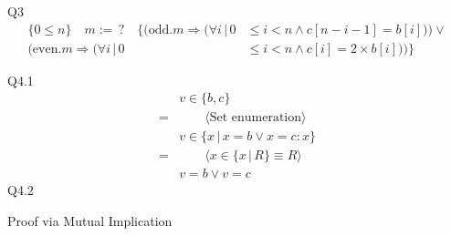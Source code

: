 \documentclass{article}
\begin{document}
    \vspace{10mm}
    Q3 
    \begin{align*}
        \{0 \leq n\} \quad m :=\, ? \quad \{(\text{odd}.m \Longrightarrow (\forall i\,|\,0 &\leq i < n \land c[n-i-1] = b[i])) \vee \\(\text{even}.m \Longrightarrow (\forall i\,|\, 0 &\leq i < n \land c[i] = 2\times b[i]))\}
    \end{align*}

    \vspace{10mm}
    Q4.1
    \begin{align*}
        & v \in \{b, c\} \\
        = & \qquad \langle \text{Set enumeration} \rangle \\
        & v \in \{x\, |\, x = b \vee x = c : x\} \\
        = & \qquad \langle x \in \{x\, |\, R\} \equiv R \rangle \\
        & v = b \vee v = c
    \end{align*}
    \newpage
    Q4.2
    \begin{center}
    Proof via Mutual Implication
    \end{center}
\end{document}

